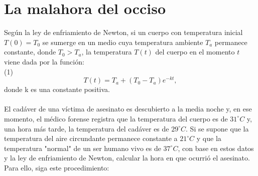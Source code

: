 \documentclass[12pt]{article}
\begin{document}
\section{La malahora del occiso}
Según la ley de enfriamiento de Newton, si un cuerpo con temperatura inicial $T (0) = T_0$ se
sumerge en un medio cuya temperatura ambiente $T_a$ permanece constante, donde $T_0 > T_a$, la
temperatura $T(t)$ del cuerpo en el momento $t$ viene dada por la función: \\
(1)\\
\[
T(t)= T_a + (T_0-T_a)e^{-kt},
\]
donde k es una constante positiva.\\ \\
El cadáver de una víctima de asesinato es descubierto a la media noche y, en ese momento,
el médico forense registra que la temperatura del cuerpo es de $31  ^{\circ} C$ y, una hora más tarde, la temperatura del cadáver es de $29  ^{\circ} C $. 
Si se supone que la temperatura del aire circundante permanece constante a $21 ^{\circ}  C$ y que la temperatura "normal" de un ser humano vivo es de $37  ^{\circ} C$, con base en estos datos y la ley de enfriamiento de Newton, calcular la hora en que ocurrió el asesinato. Para ello, siga este procedimiento:
\end{document}
